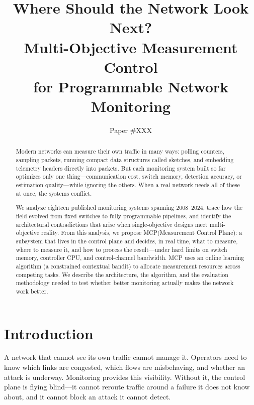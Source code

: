 \documentclass[letterpaper,twocolumn,10pt]{article}
\newcommand{\system}{MCP\xspace}
\begin{document}
\title{Where Should the Network Look Next?\\
Multi-Objective Measurement Control\\
for Programmable Network Monitoring}

\author{Paper \#XXX }

\maketitle

\begin{abstract}

Modern networks can measure their own traffic in many ways:
polling counters, sampling packets, running compact data structures
called sketches, and embedding telemetry headers directly into
packets. But each monitoring system built so far optimizes only
one thing---communication cost, switch memory, detection
accuracy, or estimation quality---while ignoring the others.
When a real network needs all of these at once, the systems
conflict.

We analyze eighteen published monitoring systems spanning
2008--2024, trace how the field evolved from fixed switches to
fully programmable pipelines, and identify the architectural
contradictions that arise when single-objective designs meet
multi-objective reality. From this analysis, we propose
\system (Measurement Control Plane): a subsystem that lives in
the control plane and decides, in real time, what to measure,
where to measure it, and how to process the result---under hard
limits on switch memory, controller CPU, and control-channel
bandwidth. \system uses an online learning algorithm (a
constrained contextual bandit) to allocate measurement resources
across competing tasks. We describe the architecture, the
algorithm, and the evaluation methodology needed to test whether
better monitoring actually makes the network work better.

\end{abstract}

\section{Introduction}
\label{sec:intro}

A network that cannot see its own traffic cannot manage it.
Operators need to know which links are congested, which flows
are misbehaving, and whether an attack is underway. Monitoring
provides this visibility. Without it, the control plane is flying
blind---it cannot reroute traffic around a failure it does not
know about, and it cannot block an attack it cannot detect.
\end{document}
